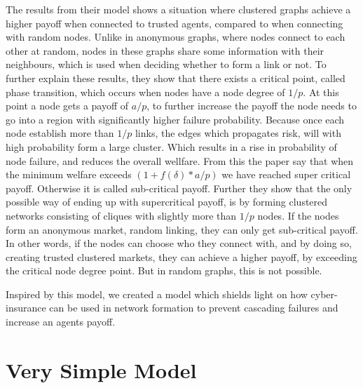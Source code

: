The results from their model shows a situation where clustered graphs achieve a higher payoff when connected to trusted agents, compared to when connecting with random nodes. Unlike in anonymous graphs, where nodes connect to each other at random, nodes in these graphs share some information with their neighbours, which is used when deciding whether to form a link or not. 
To further explain these results, they show that there exists a critical point, called phase transition, which occurs when nodes have a node degree of $1/p$. 
At this point a node gets a payoff of $a/p$, to further increase the payoff the node needs to go into a region with significantly higher failure probability. 
Because once each node establish more than $1/p$ links, the edges which propagates risk, will with high probability form a large cluster. Which results in a rise in probability of node failure, and reduces the overall wellfare.
From this the paper say that when the minimum welfare exceeds 
$(1+f(\delta)*a/p)$
we have reached super critical payoff. Otherwise it is called sub-critical payoff. 
Further they show that the only possible way of ending up with supercritical payoff, is by forming clustered networks consisting of cliques with slightly more than $1/p$ nodes. 
If the nodes form an anonymous market, random linking, they can only get sub-critical payoff. 
In other words, if the nodes can choose who they connect with, and by doing so, creating trusted clustered markets, they can achieve a higher payoff, by exceeding the critical node degree point. But in random graphs, this is not possible. 


Inspired by this model, we created a model which shields light on how cyber-insurance can be used in network formation to prevent cascading failures and increase an agents payoff.  



\section{Very Simple Model}

